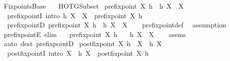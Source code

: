 %
\begin{isabellebody}%
%
%
\isadelimdocument
%
\endisadelimdocument
%
\isatagdocument
\isanewline
%
\isamarkuptrue%
%
\endisatagdocument
{\isafolddocument}%
%
\isadelimdocument
%
\endisadelimdocument
%
\isadelimtheory
%
\endisadelimtheory
%
\isatagtheory
{}\isamarkupfalse%
\ Fixpoints{\isacharunderscore}{\kern0pt}Base\isanewline
\ \ \ HOTG{\isachardot}{\kern0pt}Subset\isanewline
{}%
\endisatagtheory
{\isafoldtheory}%
%
\isadelimtheory
\isanewline
%
\endisadelimtheory
\isanewline
{}\isamarkupfalse%
\ {\isachardoublequoteopen}prefixpoint\ X\ h\ {\isasymequiv}\ h\ X\ {\isasymsubseteq}\ X{\isachardoublequoteclose}\isanewline
\isanewline
{}\isamarkupfalse%
\isanewline
\ \ prefixpointI\ {\isacharbrackleft}{\kern0pt}intro{\isacharbang}{\kern0pt}{\isacharbrackright}{\kern0pt}{\isacharcolon}{\kern0pt}\ {\isachardoublequoteopen}h\ X\ {\isasymsubseteq}\ X\ {\isasymLongrightarrow}\ prefixpoint\ X\ h{\isachardoublequoteclose}\ \isanewline
\ \ prefixpointD{\isacharcolon}{\kern0pt}\ {\isachardoublequoteopen}prefixpoint\ X\ h\ {\isasymLongrightarrow}\ h\ X\ {\isasymsubseteq}\ X{\isachardoublequoteclose}\isanewline
%
\isadelimproof
\ \ %
\endisadelimproof
%
\isatagproof
{}\isamarkupfalse%
\ prefixpoint{\isacharunderscore}{\kern0pt}def\ \isamarkupfalse%
\ assumption%
\endisatagproof
{\isafoldproof}%
%
\isadelimproof
\isanewline
%
\endisadelimproof
\isanewline
{}\isamarkupfalse%
\ prefixpointE\ {\isacharbrackleft}{\kern0pt}elim{\isacharbrackright}{\kern0pt}{\isacharcolon}{\kern0pt}\isanewline
\ \ \ {\isachardoublequoteopen}prefixpoint\ X\ h{\isachardoublequoteclose}\isanewline
\ \ \ {\isachardoublequoteopen}h\ X\ {\isasymsubseteq}\ X{\isachardoublequoteclose}\isanewline
%
\isadelimproof
\ \ %
\endisadelimproof
%
\isatagproof
{}\isamarkupfalse%
\ assms\ \isamarkupfalse%
\ {\isacharparenleft}{\kern0pt}auto\ dest{\isacharcolon}{\kern0pt}\ prefixpointD{\isacharparenright}{\kern0pt}%
\endisatagproof
{\isafoldproof}%
%
\isadelimproof
\isanewline
%
\endisadelimproof
\isanewline
{}\isamarkupfalse%
\ {\isachardoublequoteopen}postfixpoint\ X\ h\ {\isasymequiv}\ X\ {\isasymsubseteq}\ h\ X{\isachardoublequoteclose}\isanewline
\isanewline
{}\isamarkupfalse%
\isanewline
\ \ postfixpointI\ {\isacharbrackleft}{\kern0pt}intro{\isacharbang}{\kern0pt}{\isacharbrackright}{\kern0pt}{\isacharcolon}{\kern0pt}\ {\isachardoublequoteopen}X\ {\isasymsubseteq}\ h\ X\ {\isasymLongrightarrow}\ postfixpoint\ X\ h{\isachardoublequoteclose}\ \isanewline

\end{isabellebody}
